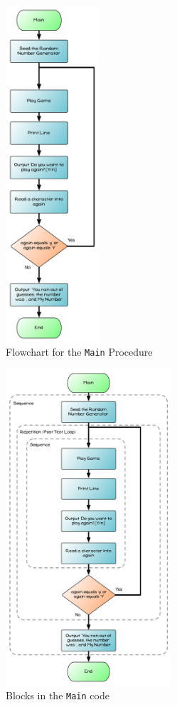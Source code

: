 \begin{figure}[htbp]
   \centering
   \includegraphics[width=0.31\textwidth]{./topics/control-flow/diagrams/Main} 
   \caption{Flowchart for the \texttt{Main} Procedure}
   \label{fig:main}
\end{figure}

\clearpage

\begin{figure}[htbp]
   \centering
   \includegraphics[width=0.55\textwidth]{./topics/control-flow/diagrams/Main1} 
   \caption{Blocks in the \texttt{Main} code}
   \label{fig:main-1}
\end{figure}

